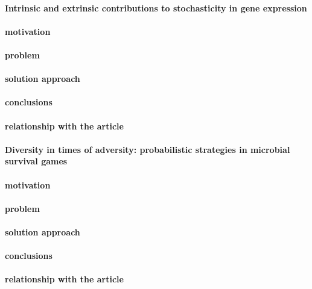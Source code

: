 \documentclass{article}
\begin{document}
\paragraph{Intrinsic and extrinsic contributions to stochasticity in gene expression\cite{peter_s._swain_intrinsic_2002}}

\paragraph{motivation}
\paragraph{problem}
\paragraph{solution approach}
\paragraph{conclusions}
\paragraph{relationship with the article}

\paragraph{Diversity in times of adversity: probabilistic strategies in microbial survival games\cite{denise_m._wolf_diversity_2005}}

\paragraph{motivation}
\paragraph{problem}
\paragraph{solution approach}
\paragraph{conclusions}
\paragraph{relationship with the article}
\end{document}
